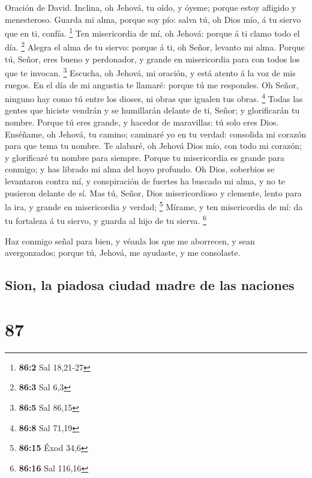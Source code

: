  Oración de David. Inclina, oh Jehová, tu oído, y óyeme;
porque estoy afligido y menesteroso.  Guarda mi alma, porque
soy pío: salva tú, oh Dios mío, á tu siervo que en ti, confía.
\footnote{\textbf{86:2} Sal 18,21-27}  Ten misericordia de
mí, oh Jehová: porque á ti clamo todo el día. \footnote{\textbf{86:3}
  Sal 6,3}  Alegra el alma de tu siervo: porque á ti, oh
Señor, levanto mi alma.  Porque tú, Señor, eres bueno y
perdonador, y grande en misericordia para con todos los que te invocan.
\footnote{\textbf{86:5} Sal 86,15}  Escucha, oh Jehová, mi
oración, y está atento á la voz de mis ruegos.  En el día de
mi angustia te llamaré: porque tú me respondes.  Oh Señor,
ninguno hay como tú entre los dioses, ni obras que igualen tus obras.
\footnote{\textbf{86:8} Sal 71,19}  Todas las gentes que
hiciste vendrán y se humillarán delante de ti, Señor; y glorificarán tu
nombre.  Porque tú eres grande, y hacedor de maravillas: tú
solo eres Dios.  Enséñame, oh Jehová, tu camino; caminaré
yo en tu verdad: consolida mi corazón para que tema tu nombre.
 Te alabaré, oh Jehová Dios mío, con todo mi corazón; y
glorificaré tu nombre para siempre.  Porque tu misericordia
es grande para conmigo; y has librado mi alma del hoyo profundo.
 Oh Dios, soberbios se levantaron contra mí, y conspiración
de fuertes ha buscado mi alma, y no te pusieron delante de sí.
 Mas tú, Señor, Dios misericordioso y clemente, lento para
la ira, y grande en misericordia y verdad; \footnote{\textbf{86:15} Éxod
  34,6}  Mírame, y ten misericordia de mí: da tu fortaleza
á tu siervo, y guarda al hijo de tu sierva. \footnote{\textbf{86:16} Sal
  116,16}

 Haz conmigo señal para bien, y véanla los que me
aborrecen, y sean avergonzados; porque tú, Jehová, me ayudaste, y me
consolaste.

\hypertarget{sion-la-piadosa-ciudad-madre-de-las-naciones}{%
\subsection{Sion, la piadosa ciudad madre de las
naciones}\label{sion-la-piadosa-ciudad-madre-de-las-naciones}}

\hypertarget{section-86}{%
\section{87}\label{section-86}}

